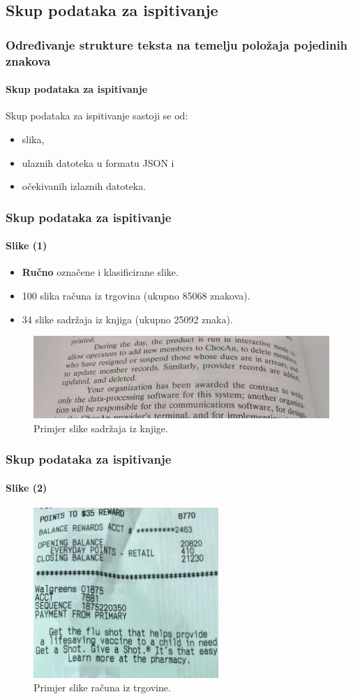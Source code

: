 \documentclass{beamer}
\begin{document}
\subsection{Skup podataka za ispitivanje}
\begin{frame}
\frametitle{Određivanje strukture teksta na temelju položaja pojedinih znakova}
\framesubtitle{Skup podataka za ispitivanje}
Skup podataka za ispitivanje sastoji se od:
\begin{itemize}
    \item slika,
    \item ulaznih datoteka u formatu JSON i
    \item očekivanih izlaznih datoteka.
\end{itemize}
\end{frame}
\begin{frame}
\frametitle{Skup podataka za ispitivanje}
\framesubtitle{Slike (1)}
\begin{itemize}
    \item \textbf{Ručno} označene i klasificirane slike.
    \item 100 slika računa iz trgovina (ukupno 85068 znakova).
    \item 34 slike sadržaja iz knjiga (ukupno 25092 znaka).
\end{itemize}
\begin{figure}[htb]
    \centering
    \includegraphics[width=\textwidth]{images/book-example-03.jpg}
    \caption{Primjer slike sadržaja iz knjige.}
    \label{fig:book-example-03}
\end{figure}
\end{frame}
\begin{frame}
\frametitle{Skup podataka za ispitivanje}
\framesubtitle{Slike (2)}
\begin{figure}[htb]
    \centering
    \includegraphics[width=7cm]{images/receipt-example-04.jpg}
    \caption{Primjer slike računa iz trgovine.}
    \label{fig:receipt-example-04}
\end{figure}
\end{frame}
\end{document}
